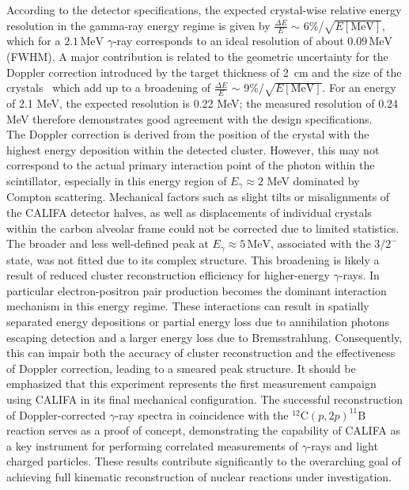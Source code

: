 According to the detector specifications, the expected crystal-wise relative energy resolution in the gamma-ray energy regime is given by $\frac{\Delta E}{E}$ $\sim$ 6\%/$\sqrt{E[\text{MeV}]}$, which for a $2.1\,\mathrm{MeV}$ $\gamma$-ray corresponds to an ideal resolution of about $0.09\,\mathrm{MeV}$ (FWHM). A major contribution is related to the geometric uncertainty for the Doppler correction introduced by the target thickness of 2~cm and the size of the crystals~\cite{tdr:barrel} which add up to a broadening of $\frac{\Delta E}{E}$ $\sim$ 9\%/$\sqrt{E[\text{MeV}]}$. For an energy of 2.1 MeV, the expected resolution is 0.22 MeV; the measured resolution of 0.24 MeV therefore demonstrates good agreement with the design specifications.\\
The Doppler correction is derived from the position of the crystal with the highest energy deposition within the detected cluster. However, this may not correspond to the actual primary interaction point of the photon within the scintillator, especially in this energy region of $E_{\gamma} \approx 2$ MeV dominated by Compton scattering.
Mechanical factors such as slight tilts or misalignments of the CALIFA detector halves, as well as displacements of individual crystals within the carbon alveolar frame could not be corrected due to limited statistics.\\
The broader and less well-defined peak at $E_{\gamma} \approx 5\,\mathrm{MeV}$, associated with the $3/2^-$ state, was not fitted due to its complex structure. This broadening is likely a result of reduced cluster reconstruction efficiency for higher-energy $\gamma$-rays. In particular electron-positron pair production becomes the dominant interaction mechanism in this energy regime. These interactions can result in spatially separated energy depositions or partial energy loss due to annihilation photons escaping detection and a larger energy loss due to Bremsstrahlung. Consequently, this can impair both the accuracy of cluster reconstruction and the effectiveness of Doppler correction, leading to a smeared peak structure.
It should be emphasized that this experiment represents the first measurement campaign using CALIFA in its final mechanical configuration. The successful reconstruction of Doppler-corrected $\gamma$-ray spectra in coincidence with the $^{12}\mathrm{C}(p,2p)^{11}\mathrm{B}$ reaction serves as a proof of concept, demonstrating the capability of CALIFA as a key instrument for performing correlated measurements of $\gamma$-rays and light charged particles. These results contribute significantly to the overarching goal of achieving full kinematic reconstruction of nuclear reactions under investigation.



